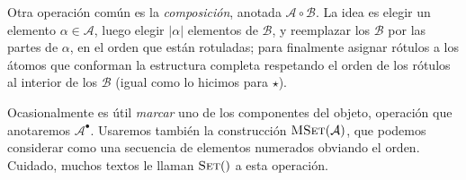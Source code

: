 \documentclass[english, spanish, fleqn, 10pt]{article}
\numberwithin{equation}{section}
\theoremstyle{definition}
\DeclareMathOperator{\Set}{\textsc{Set}}
\DeclareMathOperator{\MSet}{\textsc{MSet}}
\begin{document}
Otra operación común es la \emph{composición},
anotada \(\mathcal{A} \circ \mathcal{B}\).
La idea es elegir un elemento \(\alpha \in \mathcal{A}\),
luego elegir \(\lvert \alpha \rvert\) elementos
de \(\mathcal{B}\),
y reemplazar los \(\mathcal{B}\) por las partes de \(\alpha\),
en el orden que están rotuladas;
para finalmente asignar rótulos a los átomos
que conforman la estructura completa
respetando el orden de los rótulos
al interior de los \(\mathcal{B}\)
(igual como lo hicimos para \(\star\)).

Ocasionalmente es útil \emph{marcar}
uno de los componentes del objeto,
operación que anotaremos \(\mathcal{A}^\bullet\).
Usaremos también la construcción \(\MSet(\mathcal{A})\),
que podemos considerar como una secuencia de elementos numerados
obviando el orden.
Cuidado,
muchos textos le llaman \(\Set()\) a esta operación.
\end{document}
